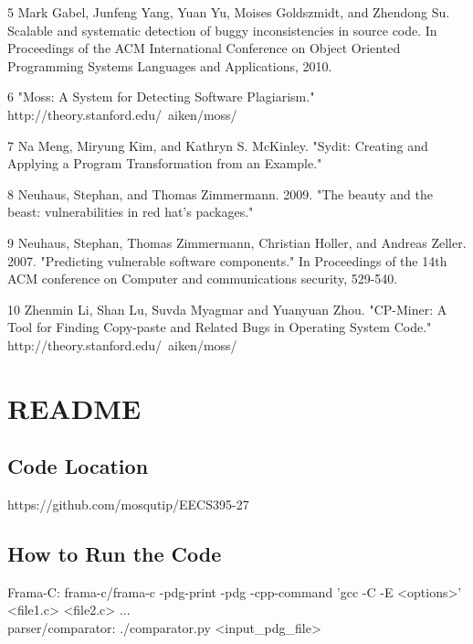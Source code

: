 \documentclass{acm_proc_article-sp}
\begin{document}
5 Mark Gabel, Junfeng Yang, Yuan Yu, Moises Goldszmidt, and Zhendong Su. 
Scalable and systematic detection of buggy inconsistencies in source code. In 
Proceedings of the ACM International Conference on Object Oriented Programming 
Systems Languages and Applications, 2010.

6 "Moss: A System for Detecting Software Plagiarism." \\
http://theory.stanford.edu/~aiken/moss/

7 Na Meng, Miryung Kim, and Kathryn S. McKinley. "Sydit: Creating and Applying 
a Program Transformation from an Example."

8 Neuhaus, Stephan, and Thomas Zimmermann. 2009. "The beauty and the beast: 
vulnerabilities in red hat's packages."

9 Neuhaus, Stephan, Thomas Zimmermann, Christian Holler, and Andreas Zeller. 
2007. "Predicting vulnerable software components." In Proceedings of the 14th 
ACM conference on Computer and communications security, 529-540.

10 Zhenmin Li, Shan Lu, Suvda Myagmar and Yuanyuan Zhou. "CP-Miner: A Tool for 
Finding Copy-paste and Related Bugs in Operating System Code." \\ 
http://theory.stanford.edu/~aiken/moss/

%

%
%
\appendix

\section{README}
\subsection{Code Location}
https://github.com/mosqutip/EECS395-27

\subsection{How to Run the Code}
Frama-C: frama-c/frama-c -pdg-print -pdg -cpp-command 'gcc -C -E <options>' 
<file1.c> <file2.c> ... \\
parser/comparator: ./comparator.py <input\_pdg\_file>

\balancecolumns
\end{document}
